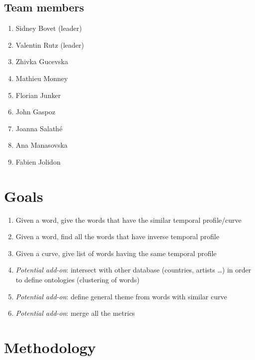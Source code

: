 \documentclass{article}
\begin{document}
\subsection{Team members}
\begin{enumerate}
\item Sidney Bovet (leader) 
\item Valentin Rutz (leader) 
\item Zhivka Gucevska 
\item Mathieu Monney 
\item Florian Junker 
\item John Gaspoz 
\item Joanna Salathé 
\item Ana Manasovska 
\item Fabien Jolidon
\end{enumerate}

\section{Goals}
\begin{enumerate}
\item Given a word, give the words that have the similar temporal profile/curve
\item Given a word, find all the words that have inverse temporal profile
\item Given a curve, give list of words having the same temporal profile
\item \textit{Potential add-on}: intersect with other database (countries, artists \dots ) in order to define ontologies (clustering of words)
\item \textit{Potential add-on}: define general theme from words with similar curve
\item \textit{Potential add-on}: merge all the metrics
\end{enumerate}


\section{Methodology}
\end{document}
